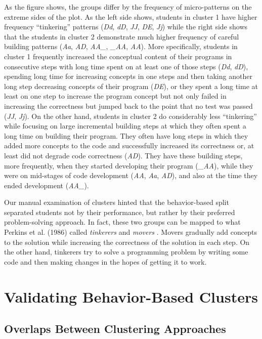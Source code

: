 \documentclass{sigchi}
\begin{document}
As the figure shows, the groups differ by the frequency of micro-patterns on the extreme sides of the plot. As the left side shows, students in cluster 1 have higher frequency ``tinkering'' patterns (\textit{Dd}, \textit{dD}, \textit{JJ}, \textit{DE}, \textit{Jj}) while the right side shows that the students in cluster 2 demonstrate much higher frequency of careful building patterns (\textit{Aa}, \textit{AD}, \textit{AA{\_}}, \textit{{\_}AA}, \textit{AA}). More specifically, students in cluster 1 frequently increased the conceptual content of their programs in consecutive steps with long time spent on at least one of those steps (\textit{Dd}, \textit{dD}), spending long time for increasing concepts in one steps and then taking another long step decreasing concepts of their program (\textit{DE}), or they spent a long time at least on one step to increase the program concept but not only failed in increasing the correctness but jumped back to the point that no test was passed (\textit{JJ},  \textit{Jj}). On the other hand, students in cluster 2 do considerably less ``tinkering'' while focusing on large incremental building steps at which they often spent a long time on building their program. They often have long steps in which they added more concepts to the code and successfully increased its correctness or, at least did not degrade code correctness (\textit{AD}). They have these building steps, more frequently, when they started developing their program (\textit{\_AA}), while they were on mid-stages of code development (\textit{AA}, \textit{Aa}, \textit{AD}), and also at the time they ended development (\textit{AA\_}).

Our manual examination of clusters hinted that the behavior-based split separated students not by their performance, but rather by their preferred problem-solving approach. In fact, these two groups can be mapped to what Perkins et al. (1986) called \textit{tinkerers} and \textit{movers} \cite{perkins1986conditions}. Movers gradually add concepts to the solution while increasing the correctness of the solution in each step. On the other hand, tinkerers try to solve a programming problem by writing some code and then making changes in the hopes of getting it to work. 

\section{Validating Behavior-Based Clusters}

\subsection{Overlaps Between Clustering Approaches} 
\end{document}

